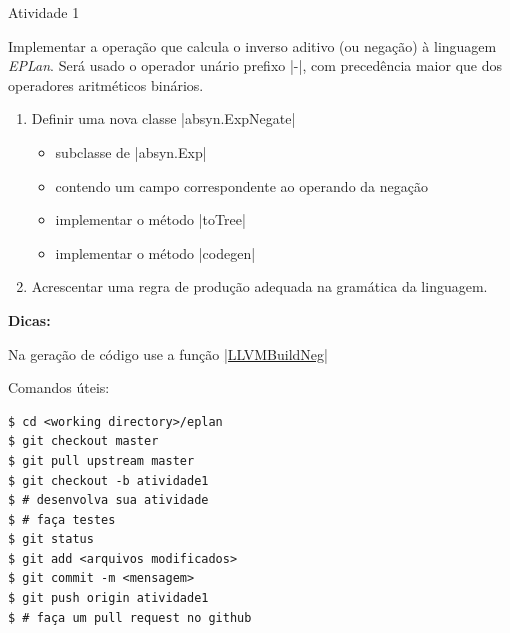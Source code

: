 \documentclass[smaller]{beamer}
\newenvironment{tips}{%
  \textbf{Dicas:}\newline
  \begin{list}{*}{%
      \setlength{\topsep}{0pt}%
      \setlength{\itemsep}{0pt}%
      \setlength{\parsep}{0pt}%
    }%
  }{%
  \end{list}%
}
\newcommand{\lang}{\textsl{EPLan}}
\begin{document}
\begin{frame}{Atividade 1}
  \begin{tcolorbox}[title=Inverso aditivo]
    Implementar a operação que calcula o inverso aditivo (ou negação)
    à linguagem \lang{}. Será usado o operador unário prefixo
    \pyginline|-|, com precedência maior que dos operadores
    aritméticos binários.
    \begin{enumerate}
      \item Definir uma nova classe \pyginline|absyn.ExpNegate|
      \begin{itemize}
        \item subclasse de \pyginline|absyn.Exp|
        \item contendo um campo correspondente ao operando da negação
        \item implementar o método \pyginline|toTree|
        \item implementar o método \pyginline|codegen|
      \end{itemize}
      \item Acrescentar uma regra de produção adequada na gramática da
      linguagem.
    \end{enumerate}

    \begin{tips}
      \item Na geração de código use a função
      \href{http://llvm.org/docs/doxygen/html/group__LLVMCCoreInstructionBuilder.html#gaf748025627b03f4f2659b006b127b758}{\pyginline|LLVMBuildNeg|}
    \end{tips}
\end{tcolorbox}

  \framebreak
  
  Comandos úteis:
\begin{Verbatim}[frame=single]
$ cd <working directory>/eplan
$ git checkout master
$ git pull upstream master
$ git checkout -b atividade1
$ # desenvolva sua atividade
$ # faça testes
$ git status
$ git add <arquivos modificados>
$ git commit -m <mensagem>
$ git push origin atividade1
$ # faça um pull request no github
\end{Verbatim}
\end{frame}




\end{document}
